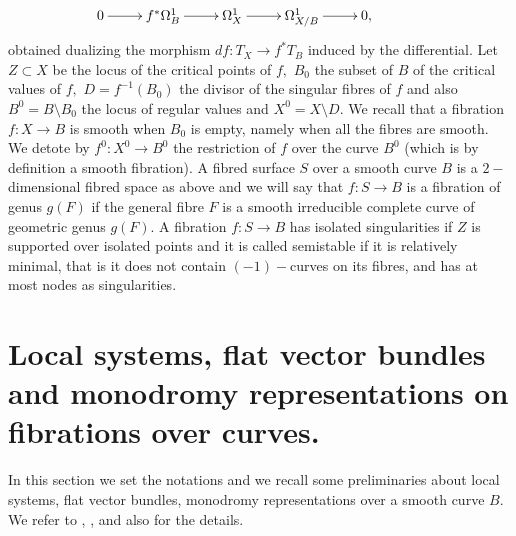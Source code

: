 \documentclass[a4paper,11pt]{amsart}
\begin{document}
{\begin{equation}
\xymatrix@!R{
	{0}  & {f^*\Omega^1_B}  & {\Omega^1_X}  & {\Omega^1_{X/B}}  & {0,}                                  & 
	\ar"1,1";"1,2"\ar"1,2";"1,3"\ar"1,3";"1,4"\ar"1,4";"1,5"
	\hole
}
\end{equation}
obtained dualizing the morphism $d f:T_X\to f^*T_B$ induced by the differential. 
Let $Z\subset X$ be the locus of the critical points of $f,$ $B_0$ the subset of $B$ of the critical values of $f,$ $D=f^{-1}(B_0)$ the divisor of the singular fibres of $f$ and also $B^0=B\setminus B_0$ the locus of regular values and $X^0=X\setminus D.$ We recall that a fibration $f:X\to B$ is smooth when $B_0$ is empty, namely when all the fibres are smooth. We detote by $f^0:X^0\to B^0$ the restriction of $f$ over the curve $B^0$ (which is by definition a smooth fibration). 
A fibred surface $S$ over a smooth curve $B$ is a $2-$dimensional fibred space as above and we will say that $f: S \to B$ is a fibration of genus $g(F)$ if the general fibre $F$ is a smooth irreducible complete curve of geometric genus $g(F).$ A fibration $f: S \to B$ has isolated singularities if $Z$ is supported over isolated points and it is called semistable if it is relatively minimal, that is it does not contain $(-1)-$curves on its fibres, and has at most nodes as singularities. 


\section{Local systems, flat vector bundles and monodromy representations on fibrations over curves.}\label{Sec-LocSyst} In this section we set the notations and we recall some preliminaries about local systems, flat vector bundles, monodromy representations over a smooth curve $B.$ We refer to \cite{V_HodgeTheoryI_2002}, \cite{V_HodgeTheoryII_2003}, \cite{PetSteen_Mixed_2008} and also \cite{Kob_Differential_1987} for the details. 
			
}
\end{document}
